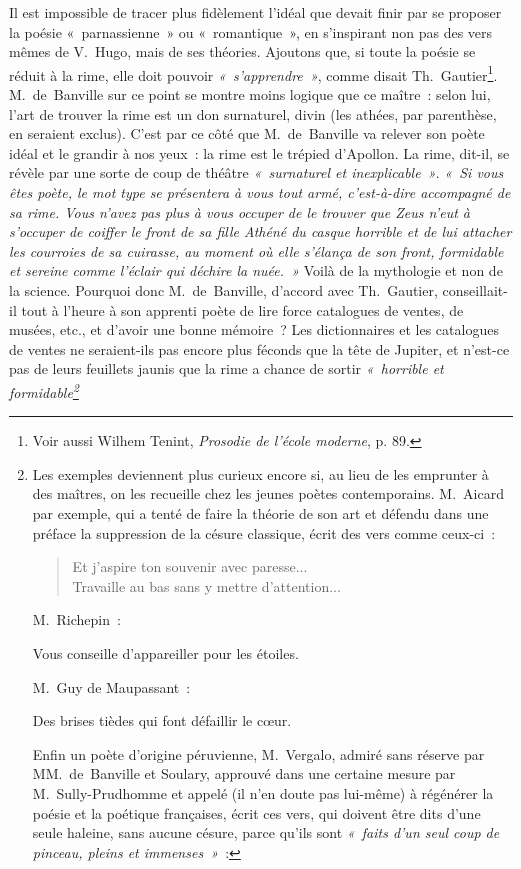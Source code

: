 \documentclass[french,twoside]{book} %
\begin{document}
Il est impossible de tracer plus fidèlement l’idéal que devait finir par se proposer la poésie « parnassienne » ou « romantique », en s’inspirant non pas des vers mêmes de V. Hugo, mais de ses théories. Ajoutons que, si toute la poésie se réduit à la rime, elle doit pouvoir \emph{« s’apprendre »}, comme disait Th. Gautier\footnote{Voir aussi Wilhem Tenint, \emph{Prosodie de l’école moderne}, p. 89.}. M. de Banville sur ce point se montre moins logique que ce maître : selon lui, l’art de trouver la rime est un don surnaturel, divin (les athées, par parenthèse, en seraient exclus). C’est par ce côté que M. de Banville va relever son poète idéal et le grandir à nos yeux : la rime est le trépied d’Apollon. La rime, dit-il, se révèle par une sorte de coup de théâtre \emph{« surnaturel et inexplicable »}. \emph{« Si vous êtes poète, le mot type se présentera à vous tout armé, c’est-à-dire accompagné de sa rime. Vous n’avez pas plus à vous occuper de le trouver que Zeus n’eut à s’occuper de coiffer le front de sa fille Athéné du casque horrible et de lui attacher les courroies de sa cuirasse, au moment où elle s’élança de son front, formidable et sereine comme l’éclair qui déchire la nuée. »} Voilà de la mythologie et non de la science. Pourquoi donc M. de Banville, d’accord avec Th. Gautier, conseillait-il tout à l’heure à son apprenti poète de lire force catalogues de ventes, de musées, etc., et d’avoir une bonne mémoire ? Les dictionnaires et les catalogues de ventes ne seraient-ils pas encore plus féconds que la tête de Jupiter, et n’est-ce  pas de leurs feuillets jaunis que la rime a chance de sortir \emph{« horrible et formidable\footnote{\noindent Les exemples deviennent plus curieux encore si, au lieu de les emprunter à des maîtres, on les recueille chez les jeunes poètes contemporains. M. Aicard par exemple, qui a tenté de faire la théorie de son art et défendu dans une préface la suppression de la césure classique, écrit des vers comme ceux-ci :\par

\begin{verse}
Et j’aspire ton souvenir avec paresse...\\
Travaille au bas sans y mettre d’attention...\\
\end{verse}
\par
\noindent M. Richepin :\par
Vous conseille d’appareiller pour les étoiles.\\
\par
\noindent M. Guy de Maupassant :\par
Des brises tièdes qui font défaillir le cœur.\\
\par
\noindent Enfin un poète d’origine péruvienne, M. Vergalo, admiré sans réserve par MM. de Banville et Soulary, approuvé dans une certaine mesure par M. Sully-Prudhomme et appelé (il n’en doute pas lui-même) à régénérer la poésie et la poétique françaises, écrit ces vers, qui doivent être dits d’une seule haleine, sans aucune césure, parce qu’ils sont \emph{« faits d’un seul coup de pinceau, pleins et immenses »} :\par

}}
\end{document}
